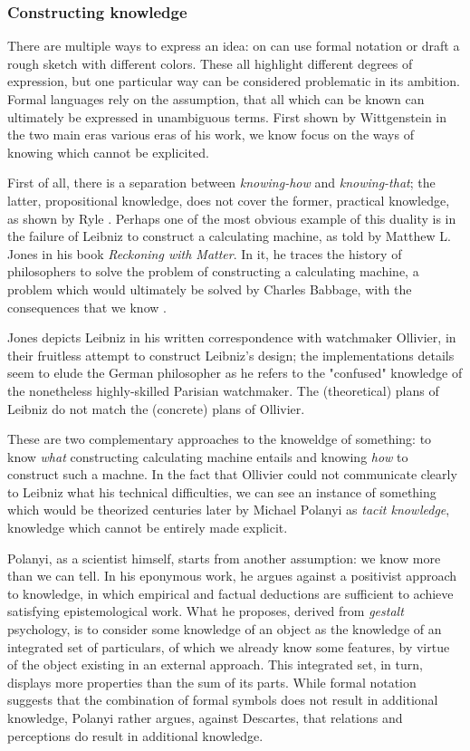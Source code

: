 \subsubsection{Constructing knowledge}

There are multiple ways to express an idea: on can use formal notation or draft a rough sketch with different colors. These all highlight different degrees of expression, but one particular way can be considered problematic in its ambition. Formal languages rely on the assumption, that all which can be known can ultimately be expressed in unambiguous terms. First shown by Wittgenstein in the two main eras various eras of his work, we know focus on the ways of knowing which cannot be explicited.

First of all, there is a separation between \emph{knowing-how} and \emph{knowing-that}; the latter, propositional knowledge, does not cover the former, practical knowledge, as shown by Ryle \citep{ryle_concept_1951}. Perhaps one of the most obvious example of this duality is in the failure of Leibniz to construct a calculating machine, as told by Matthew L. Jones in his book \emph{Reckoning with Matter}. In it, he traces the history of philosophers to solve the problem of constructing a calculating machine, a problem which would ultimately be solved by Charles Babbage, with the consequences that we know \citep{jones_reckoning_2016}.

Jones depicts Leibniz in his written correspondence with watchmaker Ollivier, in their fruitless attempt to construct Leibniz's design; the implementations details seem to elude the German philosopher as he refers to the "confused" knowledge of the nonetheless highly-skilled Parisian watchmaker. The (theoretical) plans of Leibniz do not match the (concrete) plans of Ollivier.

These are two complementary approaches to the knoweldge of something: to know \emph{what} constructing calculating machine entails and knowing \emph{how} to construct such a machne. In the fact that Ollivier could not communicate clearly to Leibniz what his technical difficulties, we can see an instance of something which would be theorized centuries later by Michael Polanyi as \emph{tacit knowledge}, knowledge which cannot be entirely made explicit.

Polanyi, as a scientist himself, starts from another assumption: we know more than we can tell. In his eponymous work, he argues against a positivist approach to knowledge, in which empirical and factual deductions are sufficient to achieve satisfying epistemological work. What he proposes, derived from \emph{gestalt} psychology, is to consider some knowledge of an object as the knowledge of an integrated set of particulars, of which we already know some features, by virtue of the object existing in an external approach. This integrated set, in turn, displays more properties than the sum of its parts. While formal notation suggests that the combination of formal symbols does not result in additional knowledge, Polanyi rather argues, against Descartes, that relations and perceptions do result in additional knowledge.

